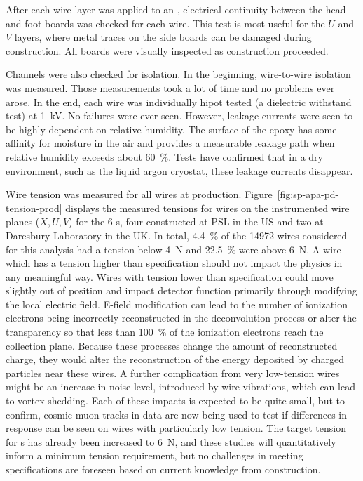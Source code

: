 
After each wire layer was applied to an , electrical continuity between the head and foot boards was checked for each wire.  This test is most useful for the $U$ and $V$ layers, where metal traces on the side boards can be damaged during construction. All boards were visually inspected as construction proceeded.

Channels were also checked for isolation.  In the beginning, wire-to-wire isolation was measured. Those measurements took a lot of time and no problems ever arose.  In the end, each wire was individually hipot tested (a dielectric withstand test) at \SI{1}{kV}. No failures were ever seen. However, leakage currents were seen to be highly dependent on relative humidity.  The surface of the epoxy has some affinity for moisture in the air and provides a measurable leakage path when relative humidity exceeds about \SI{60}{\%}. Tests have confirmed that in a dry environment, such as the liquid argon cryostat, these leakage currents disappear.

Wire tension was measured for all wires at production.  Figure~\ref{fig:sp-apa-pd-tension-prod} displays the measured tensions for wires on the instrumented wire planes ($X, U, V$) for the 6  s, four constructed at PSL in the US and two at Daresbury Laboratory in the UK.  %
In total, \SI{4.4}{\%} of the \num{14972} wires considered for this analysis had a tension below \SI{4}{N} and \SI{22.5}{\%} were above \SI{6}{N}. 
A wire which has a tension higher than specification should not impact the physics in any meaningful way. Wires with tension lower than specification could move slightly out of position and impact detector function primarily through modifying the local electric field. E-field modification can lead to the number of ionization electrons being incorrectly reconstructed in the deconvolution process or alter the transparency so that less than \SI{100}{\%} of the ionization electrons reach the collection plane. Because these processes change the amount of reconstructed charge, they would alter the reconstruction of the energy deposited by charged particles near these wires. A further complication from very low-tension wires might be an increase in noise level, introduced by wire vibrations, which can lead to vortex shedding.  Each of these impacts is expected to be quite small, but to confirm, cosmic muon tracks in  data are now being used to test if differences in response can be seen on wires with particularly low tension.  The target tension for  s has already been increased to \SI{6}{N}, and these  studies will quantitatively inform a minimum tension requirement, but no challenges in meeting specifications are foreseen based on current knowledge from  construction.   

